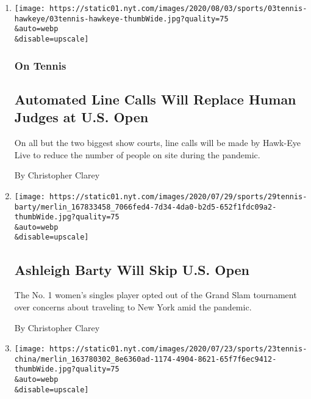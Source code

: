 \begin{enumerate}
\def\labelenumi{\arabic{enumi}.}
\item
  \href{/2020/08/03/sports/tennis/us-open-hawkeye-line-judges.html}{}

  \texttt{[image: https://static01.nyt.com/images/2020/08/03/sports/03tennis-hawkeye/03tennis-hawkeye-thumbWide.jpg?quality=75\\\&auto=webp\\\&disable=upscale]}

  \hypertarget{on-tennis}{%
  \subsubsection{On Tennis}\label{on-tennis}}

  \hypertarget{automated-line-calls-will-replace-human-judges-at-us-open}{%
  \subsection{Automated Line Calls Will Replace Human Judges at U.S.
  Open}\label{automated-line-calls-will-replace-human-judges-at-us-open}}

  On all but the two biggest show courts, line calls will be made by
  Hawk-Eye Live to reduce the number of people on site during the
  pandemic.

  By Christopher Clarey
\item
  \href{/2020/07/29/sports/tennis/ashleigh-barty-us-open.html}{}

  \texttt{[image: https://static01.nyt.com/images/2020/07/29/sports/29tennis-barty/merlin\_167833458\_7066fed4-7d34-4da0-b2d5-652f1fdc09a2-thumbWide.jpg?quality=75\\\&auto=webp\\\&disable=upscale]}

  \hypertarget{ashleigh-barty-will-skip-us-open}{%
  \subsection{Ashleigh Barty Will Skip U.S.
  Open}\label{ashleigh-barty-will-skip-us-open}}

  The No. 1 women's singles player opted out of the Grand Slam
  tournament over concerns about traveling to New York amid the
  pandemic.

  By Christopher Clarey
\item
  \href{/2020/07/23/sports/tennis/wta-tour-china-tournaments-canceled.html}{}

  \texttt{[image: https://static01.nyt.com/images/2020/07/23/sports/23tennis-china/merlin\_163780302\_8e6360ad-1174-4904-8621-65f7f6ec9412-thumbWide.jpg?quality=75\\\&auto=webp\\\&disable=upscale]}


\end{enumerate}
